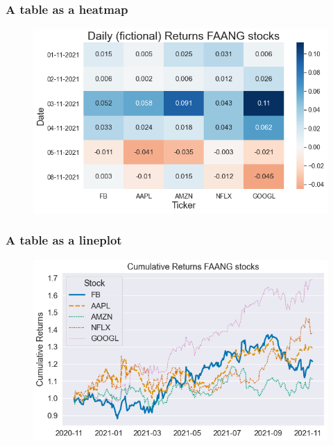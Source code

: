 \documentclass{beamer}
\begin{document}
\begin{frame}
    \frametitle{A table as a heatmap}
    \begin{figure}[H]
      \centering
      \includegraphics[width=\linewidth]{heatmap.png}
    \end{figure}        
\end{frame}


\begin{frame}
  \frametitle{A table as a lineplot}
  \begin{figure}[H]
    \centering
    \includegraphics[width=\linewidth]{lineplot.png}
  \end{figure}        
\end{frame}

\end{document}
